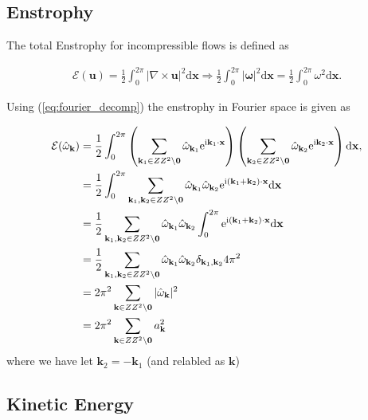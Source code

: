 \documentclass[9pt]{article}
\newcommand{\ii}{\mathrm{i}}      								  %
\newcommand{\e}{\mathrm{e}}      								  %
\newcommand{\curl}[1]{\nabla \times {#1}}								%
\newcommand{\bfu}{\mathbf{u}}											%
\newcommand{\omegahat}[1]{\hat{\omega}_{ \mathbf{#1} } }								%
\newcommand{\bfx}{\mathbf{x}}								%
\newcommand{\bfk}{\mathbf{k}}								%
\newcommand{\bfkn}[1]{\mathbf{k}_{#1}}								%
\begin{document}
\subsection{Enstrophy}

The total Enstrophy for incompressible flows is defined as 

\begin{align}
	\mathcal{E}(\bfu) = \frac{1}{2}\int_{0}^{2\pi} |\curl{\bfu}|^2 \mathrm{d}\bfx \Rightarrow \frac{1}{2}\int_{0}^{2\pi} |\bm{\omega}|^2 \mathrm{d}\bfx = \frac{1}{2}\int_{0}^{2\pi} \omega^2 \mathrm{d}\bfx .
	\label{eq:enstrophy_def}
\end{align}

Using (\ref{eq:fourier_decomp}) the enstrophy in Fourier space is given as 

\begin{align}
	\mathcal{E}(\omegahat{k}) &= \frac{1}{2}\int_{0}^{2\pi} \left(\sum_{\mathbf{k}_1\in \mathbb{Z}^2\setminus \mathbf{0}}\hat{\omega}_{\mathbf{k}_1}\e^{\ii \mathbf{k}_1\cdot \mathbf{x}}\right)\left(\sum_{\mathbf{k}_2\in \mathbb{Z}^2\setminus \mathbf{0}}\hat{\omega}_{\mathbf{k}_2}\e^{\ii \mathbf{k}_2\cdot \mathbf{x}}\right)  \mathrm{d}\bfx, \notag \\
	&= \frac{1}{2}\int_{0}^{2\pi}\sum_{\mathbf{k}_1, \bfkn{2}\in \mathbb{Z}^2\setminus \mathbf{0}}\hat{\omega}_{\mathbf{k}_1}\hat{\omega}_{\mathbf{k}_2} \e^{\ii \left(\mathbf{k}_1 + \bfkn{2}\right)\cdot \mathbf{x}}\mathrm{d}\bfx \notag \\
	&=\frac{1}{2}\sum_{\mathbf{k}_1, \bfkn{2}\in \mathbb{Z}^2\setminus \mathbf{0}}\hat{\omega}_{\mathbf{k}_1}\hat{\omega}_{\mathbf{k}_2} \int_{0}^{2\pi} \e^{\ii \left(\mathbf{k}_1 + \bfkn{2}\right)\cdot \mathbf{x}}\mathrm{d}\bfx \notag \\
	&= \frac{1}{2}\sum_{\mathbf{k}_1, \bfkn{2}\in \mathbb{Z}^2\setminus \mathbf{0}}\hat{\omega}_{\mathbf{k}_1}\hat{\omega}_{\mathbf{k}_2} \delta_{\bfkn{1}, \bfkn{2}} 4 \pi^2 \notag \\
	&= 2 \pi^2 \sum_{\mathbf{k}\in \mathbb{Z}^2\setminus \mathbf{0}}|\hat{\omega}_{\mathbf{k}} |^2 \notag \\
	&= 2 \pi^2 \sum_{\mathbf{k}\in \mathbb{Z}^2\setminus \mathbf{0}} a_{\bfk}^2
	\label{eq:enstrophy_fourier}
\end{align}
where we have let $\bfkn{2} = - \bfkn{1}$ (and relabled as $\bfk$)


\subsection{Kinetic Energy}
\end{document}
